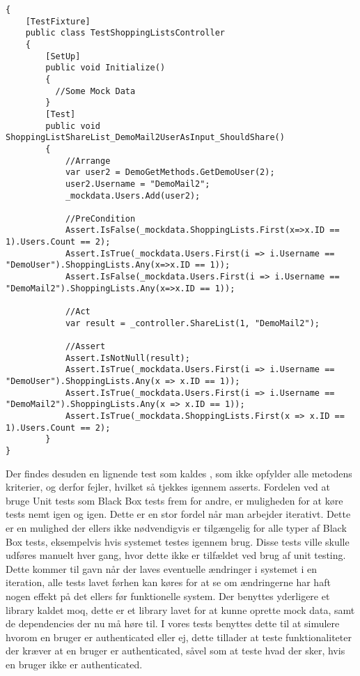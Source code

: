 \begin{lstlisting}[caption={Test for metoden \class{ShareList}.}, label=lsttest]
{
    [TestFixture]
    public class TestShoppingListsController
    {
    	[SetUp]
        public void Initialize()
        {
          //Some Mock Data
        }
        [Test]
        public void ShoppingListShareList_DemoMail2UserAsInput_ShouldShare()
        {
            //Arrange
            var user2 = DemoGetMethods.GetDemoUser(2);
            user2.Username = "DemoMail2";
            _mockdata.Users.Add(user2); 

            //PreCondition
            Assert.IsFalse(_mockdata.ShoppingLists.First(x=>x.ID == 1).Users.Count == 2);
            Assert.IsTrue(_mockdata.Users.First(i => i.Username == "DemoUser").ShoppingLists.Any(x=>x.ID == 1));
            Assert.IsFalse(_mockdata.Users.First(i => i.Username == "DemoMail2").ShoppingLists.Any(x=>x.ID == 1));

            //Act
            var result = _controller.ShareList(1, "DemoMail2");

            //Assert
            Assert.IsNotNull(result);
            Assert.IsTrue(_mockdata.Users.First(i => i.Username == "DemoUser").ShoppingLists.Any(x => x.ID == 1));
            Assert.IsTrue(_mockdata.Users.First(i => i.Username == "DemoMail2").ShoppingLists.Any(x => x.ID == 1));
            Assert.IsTrue(_mockdata.ShoppingLists.First(x => x.ID == 1).Users.Count == 2);
        }
}        
\end{lstlisting}

Der findes desuden en lignende test som kaldes , som ikke opfylder alle metodens kriterier, og derfor fejler, hvilket så tjekkes igennem asserts.
Fordelen ved at bruge Unit tests som Black Box tests frem for andre, er muligheden for at køre tests nemt igen og igen.
Dette er en stor fordel når man arbejder iterativt.
Dette er en mulighed der ellers ikke nødvendigvis er tilgængelig for alle typer af Black Box tests, eksempelvis hvis systemet testes igennem brug.
Disse tests ville skulle udføres manuelt hver gang, hvor dette ikke er tilfældet ved brug af unit testing.
Dette kommer til gavn når der laves eventuelle ændringer i systemet i en iteration, alle tests lavet førhen kan køres for at se om ændringerne har haft nogen effekt på det ellers før funktionelle system. 
Der benyttes yderligere et library kaldet moq, dette er et library lavet for at kunne oprette mock data, samt de dependencies der nu må høre til.
I vores tests benyttes dette til at simulere hvorom en bruger er authenticated eller ej, dette tillader at teste funktionaliteter der kræver at en bruger er authenticated, såvel som at teste hvad der sker, hvis en bruger ikke er authenticated.

